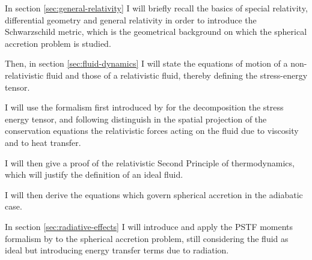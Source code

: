 \documentclass[main.tex]{subfiles}
\begin{document}
In section \ref{sec:general-relativity} I will briefly recall the basics of special relativity, differential geometry and general relativity in order to introduce the Schwarzschild metric, which is the geometrical background on which the spherical accretion problem is studied.

Then, in section \ref{sec:fluid-dynamics} I will state the equations of motion of a non-relativistic fluid and those of a relativistic fluid, thereby defining the stress-energy tensor.

I will use the formalism first introduced by \textcite[]{Eckart:1940} for the decomposition the stress energy tensor, and following \textcite[]{Taub:1978} distinguish in the spatial projection of the conservation equations the relativistic forces acting on the fluid due to viscosity and to heat transfer.

I will then give a proof of the relativistic Second Principle of thermodynamics, which will justify the definition of an ideal fluid.

I will then derive the equations which govern spherical accretion in the adiabatic case.

In section \ref{sec:radiative-effects} I will introduce and apply the PSTF moments formalism by \textcite[]{Thorne:1981feb} to the spherical accretion problem, still considering the fluid as ideal but introducing energy transfer terms due to radiation.
\end{document}
